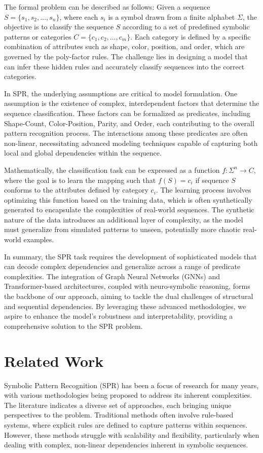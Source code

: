 \documentclass{article}
\begin{document}
The formal problem can be described as follows: Given a sequence \( S = \{s_1, s_2, \ldots, s_n\} \), where each \( s_i \) is a symbol drawn from a finite alphabet \( \Sigma \), the objective is to classify the sequence \( S \) according to a set of predefined symbolic patterns or categories \( C = \{c_1, c_2, \ldots, c_m\} \). Each category is defined by a specific combination of attributes such as shape, color, position, and order, which are governed by the poly-factor rules. The challenge lies in designing a model that can infer these hidden rules and accurately classify sequences into the correct categories.

In SPR, the underlying assumptions are critical to model formulation. One assumption is the existence of complex, interdependent factors that determine the sequence classification. These factors can be formalized as predicates, including Shape-Count, Color-Position, Parity, and Order, each contributing to the overall pattern recognition process. The interactions among these predicates are often non-linear, necessitating advanced modeling techniques capable of capturing both local and global dependencies within the sequence.

Mathematically, the classification task can be expressed as a function \( f: \Sigma^n \rightarrow C \), where the goal is to learn the mapping such that \( f(S) = c_i \) if sequence \( S \) conforms to the attributes defined by category \( c_i \). The learning process involves optimizing this function based on the training data, which is often synthetically generated to encapsulate the complexities of real-world sequences. The synthetic nature of the data introduces an additional layer of complexity, as the model must generalize from simulated patterns to unseen, potentially more chaotic real-world examples.

In summary, the SPR task requires the development of sophisticated models that can decode complex dependencies and generalize across a range of predicate complexities. The integration of Graph Neural Networks (GNNs) and Transformer-based architectures, coupled with neuro-symbolic reasoning, forms the backbone of our approach, aiming to tackle the dual challenges of structural and sequential dependencies. By leveraging these advanced methodologies, we aspire to enhance the model's robustness and interpretability, providing a comprehensive solution to the SPR problem.

\section{Related Work}
Symbolic Pattern Recognition (SPR) has been a focus of research for many years, with various methodologies being proposed to address its inherent complexities. The literature indicates a diverse set of approaches, each bringing unique perspectives to the problem. Traditional methods often involve rule-based systems, where explicit rules are defined to capture patterns within sequences. However, these methods struggle with scalability and flexibility, particularly when dealing with complex, non-linear dependencies inherent in symbolic sequences.
\end{document}
